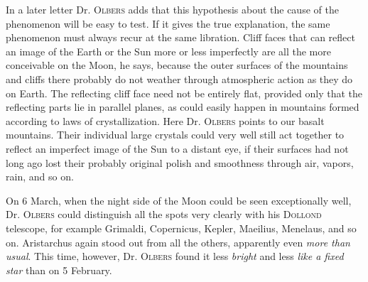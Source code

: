 In a later letter Dr. \textsc{Olbers} adds that this hypothesis about the cause of the phenomenon will be easy to test. If it gives the true explanation, the same phenomenon must always recur at the same libration. Cliff faces that can reflect an image of the Earth or the Sun more or less imperfectly are all the more conceivable on the Moon, he says, because the outer surfaces of the mountains and cliffs there probably do not weather through atmospheric action as they do on Earth. The reflecting cliff face need not be entirely flat, provided only that the reflecting parts lie in parallel planes, as could easily happen in mountains formed according to laws of crystallization. Here Dr. \textsc{Olbers} points to our basalt mountains. Their individual large crystals could very well still act together to reflect an imperfect image of the Sun to a distant eye, if their surfaces had not long ago lost their probably original polish and smoothness through air, vapors, rain, and so on.

On 6 March, when the night side of the Moon could be seen exceptionally well, Dr. \textsc{Olbers} could distinguish all the spots very clearly with his \textsc{Dollond} telescope, for example Grimaldi, Copernicus, Kepler, Maeilius, Menelaus, and so on. Aristarchus again stood out from all the others, apparently even \emph{more than usual}. This time, however, Dr. \textsc{Olbers} found it less \emph{bright} and less \emph{like a fixed star} than on 5 February.
